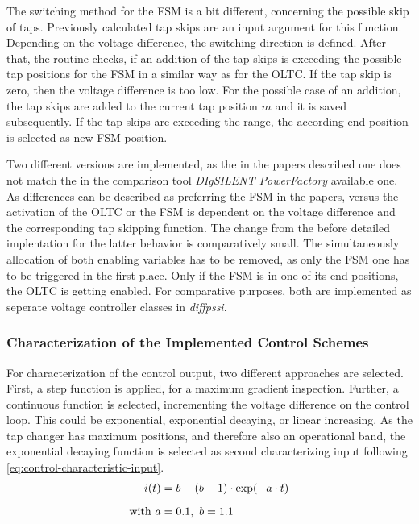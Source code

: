 The switching method for the \acs{FSM} is a bit different, concerning the possible skip of taps.
Previously calculated tap skips are an input argument for this function.
Depending on the voltage difference, the switching direction is defined.
After that, the routine checks, if an addition of the tap skips is exceeding the possible tap positions for the \acs{FSM} in a similar way as for the \acs{OLTC}.
If the tap skip is zero, then the voltage difference is too low.
For the possible case of an addition, the tap skips are added to the current tap position $m$ and it is saved subsequently.
If the tap skips are exceeding the range, the according end position is selected as new \acs{FSM} position. 

Two different versions are implemented, as the in the papers described one \autocite{burlakin_2024,burlakin_2024a} does not match the in the comparison tool \textit{DIgSILENT PowerFactory} available one.
As differences can be described as preferring the \acs{FSM} in the papers, versus the activation of the \acs{OLTC} or the \acs{FSM} is dependent on the voltage difference and the corresponding tap skipping function.
The change from the before detailed implentation for the latter behavior is comparatively small.
The simultaneously allocation of both enabling variables has to be removed, as only the \acs{FSM} one has to be triggered in the first place.
Only if the \acs{FSM} is in one of its end positions, the \acs{OLTC} is getting enabled.
For comparative purposes, both are implemented as seperate voltage controller classes in \textit{diffpssi}.

\subsubsection{Characterization of the Implemented Control Schemes}

For characterization of the control output, two different approaches are selected.
First, a step function is applied, for a maximum gradient inspection.
Further, a continuous function is selected, incrementing the voltage difference on the control loop.
This could be exponential, exponential decaying, or linear increasing.
As the tap changer has maximum positions, and therefore also an operational band, the exponential decaying function is selected as second characterizing input following \autoref{eq:control-characteristic-input}.
\begin{align}
        i(t) &=b - (b-1) \cdot \exp(-a \cdot t) \label{eq:control-characteristic-input} \\[6pt]
        \text{with } a&=0.1,~b=1.1 \notag
\end{align}

